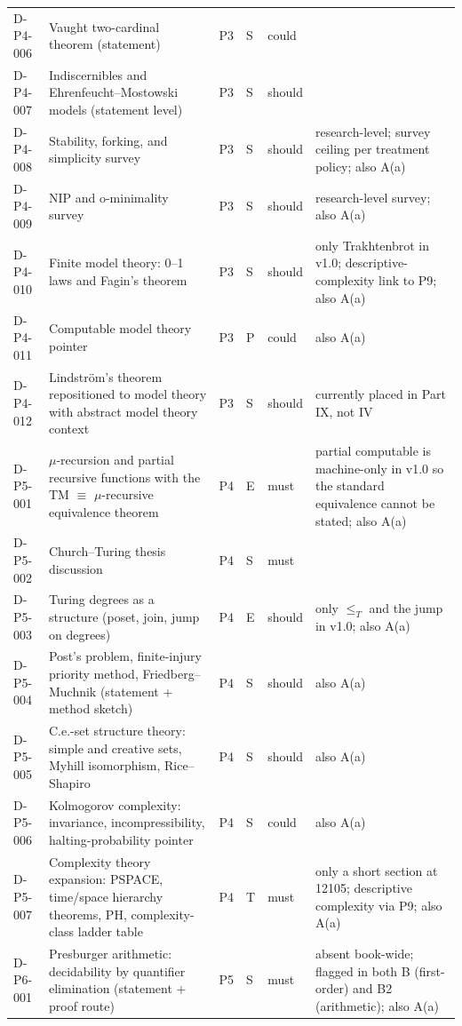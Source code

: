\begin{longtable}{@{}p{0.62in}p{2.6in}p{0.75in}p{0.22in}p{0.42in}p{1.85in}@{}}
D-P4-006 & Vaught two-cardinal theorem (statement) & P3 & S & could &  \\
D-P4-007 & Indiscernibles and Ehrenfeucht--Mostowski models (statement level) & P3 & S & should &  \\
D-P4-008 & Stability, forking, and simplicity survey & P3 & S & should & research-level; survey ceiling per treatment policy; also A(a) \\
D-P4-009 & NIP and o-minimality survey & P3 & S & should & research-level survey; also A(a) \\
D-P4-010 & Finite model theory: 0--1 laws and Fagin's theorem & P3 & S & should & only Trakhtenbrot in v1.0; descriptive-complexity link to P9; also A(a) \\
D-P4-011 & Computable model theory pointer & P3 & P & could & also A(a) \\
D-P4-012 & Lindstr\"om's theorem repositioned to model theory with abstract model theory context & P3 & S & should & currently placed in Part IX, not IV \\
D-P5-001 & \(\mu\)-recursion and partial recursive functions with the TM \(\equiv\) \(\mu\)-recursive equivalence theorem & P4 & E & must & partial computable is machine-only in v1.0 so the standard equivalence cannot be stated; also A(a) \\
D-P5-002 & Church--Turing thesis discussion & P4 & S & must &  \\
D-P5-003 & Turing degrees as a structure (poset, join, jump on degrees) & P4 & E & should & only \(\le_T\) and the jump in v1.0; also A(a) \\
D-P5-004 & Post's problem, finite-injury priority method, Friedberg--Muchnik (statement + method sketch) & P4 & S & should & also A(a) \\
D-P5-005 & C.e.-set structure theory: simple and creative sets, Myhill isomorphism, Rice--Shapiro & P4 & S & should & also A(a) \\
D-P5-006 & Kolmogorov complexity: invariance, incompressibility, halting-probability pointer & P4 & S & could & also A(a) \\
D-P5-007 & Complexity theory expansion: PSPACE, time/space hierarchy theorems, PH, complexity-class ladder table & P4 & T & must & only a short section at 12105; descriptive complexity via P9; also A(a) \\
D-P6-001 & Presburger arithmetic: decidability by quantifier elimination (statement + proof route) & P5 & S & must & absent book-wide; flagged in both B (first-order) and B2 (arithmetic); also A(a) \\

\end{longtable}
